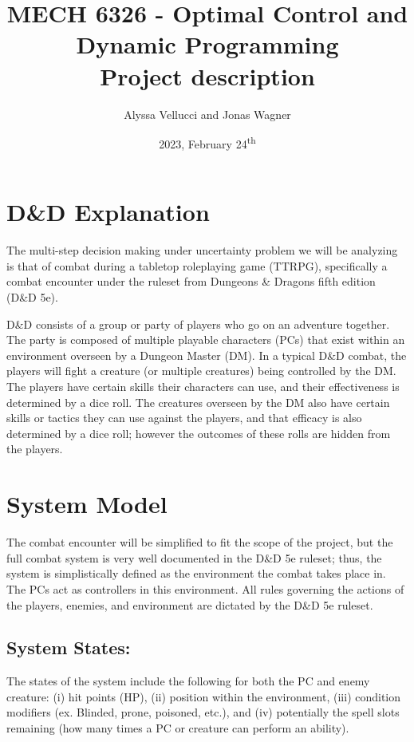 \documentclass[9pt, onecolumn]{report}
\title{
    MECH 6326 - Optimal Control and Dynamic Programming \\ 
    Project description
}
\author{Alyssa Vellucci and Jonas Wagner}
\date{2023, February 24\textsuperscript{th}}
\begin{document}
\maketitle

\section*{D\&D Explanation}
The multi-step decision making under uncertainty problem we will be analyzing is that of combat during a tabletop roleplaying game (TTRPG), specifically a combat encounter under the ruleset from Dungeons \& Dragons fifth edition (D\&D 5e).

D\&D consists of a group or party of players who go on an adventure together.
The party is composed of multiple playable characters (PCs) that exist within an environment overseen by a Dungeon Master (DM).
In a typical D\&D combat, the players will fight a creature (or multiple creatures) being controlled by the DM. 
The players have certain skills their characters can use, and their effectiveness is determined by a dice roll. 
The creatures overseen by the DM also have certain skills or tactics they can use against the players, and that efficacy is also determined by a dice roll; however the outcomes of these rolls are hidden from the players. 

\section*{System Model}
The combat encounter will be simplified to fit the scope of the project, but the full combat system is very well documented in the D\&D 5e ruleset; thus, the system is simplistically defined as the environment the combat takes place in. The PCs act as controllers in this environment. All rules governing the actions of the players, enemies, and environment are dictated by the D\&D 5e ruleset. 

\subsection*{System States:}
The states of the system include the following for both the PC and enemy creature: 
(i) hit points (HP), 
(ii) position within the environment, 
(iii) condition modifiers (ex. Blinded, prone, poisoned, etc.),
and (iv) potentially the spell slots remaining (how many times a PC or creature can perform an ability).
\end{document}
